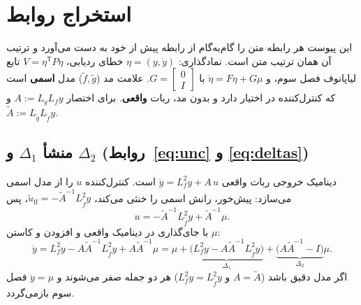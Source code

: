 \documentclass[10pt,twocolumn]{article}
\begin{document}
\begin{LTR}
\printbibliography[title={مراجع}]
\end{LTR}


\onecolumn
\setcounter{section}{0}
\renewcommand{\thesection}{پ}
\renewcommand{\thesubsection}{پ-\arabic{subsection}}
\section{استخراج روابط}
\label{app:deriv}
این پیوست هر رابطه متن را گام‌به‌گام از رابطه پیش از خود به دست می‌آورد و ترتیب آن
همان ترتیب متن است. نمادگذاری: $\eta=(y,\dot y)$ خطای ردیابی،
$V=\eta^{\mathsf T}P\eta$ تابع لیاپانوف فصل سوم، و
$\dot\eta=F\eta+G\mu$ با $G=\begin{bmatrix}0\\ I\end{bmatrix}$. علامت مد
($\tilde f,\tilde g$) مدل \textbf{اسمی} است که کنترل‌کننده در اختیار دارد و بدون
مد، ربات \textbf{واقعی}. برای اختصار $A:=L_gL_fy$ و $\tilde A:=L_{\tilde g}L_{\tilde f}y$.

\subsection{منشأ $\Delta_1$ و $\Delta_2$ (روابط~\eqref{eq:unc} و \eqref{eq:deltas})}
دینامیک خروجی ربات واقعی $\ddot y=L_f^2y+A\,u$ است. کنترل‌کننده $u$ را از مدل اسمی
می‌سازد: پیش‌خور، رانش اسمی را خنثی می‌کند، $\tilde u_{\mathrm{ff}}=-\tilde A^{-1}L_{\tilde f}^2y$، پس
\begin{equation*}
    u=-\tilde A^{-1}L_{\tilde f}^2y+\tilde A^{-1}\mu .
\end{equation*}
با جای‌گذاری در دینامیک واقعی و افزودن و کاستن $\mu$:
\begin{equation*}
    \ddot y=L_f^2y-A\tilde A^{-1}L_{\tilde f}^2y+A\tilde A^{-1}\mu
    =\mu+\underbrace{\big(L_f^2y-A\tilde A^{-1}L_{\tilde f}^2y\big)}_{\Delta_1}
    +\underbrace{\big(A\tilde A^{-1}-I\big)}_{\Delta_2}\mu .
\end{equation*}
اگر مدل دقیق باشد ($A=\tilde A$ و $L_f^2y=L_{\tilde f}^2y$) هر دو جمله صفر می‌شوند و
$\ddot y=\mu$ فصل سوم بازمی‌گردد.

\end{document}
